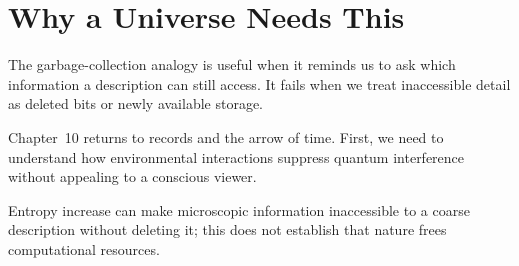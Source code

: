 \section{Why a Universe Needs This}

The garbage-collection analogy is useful when it reminds us to ask which information a description can still access. It fails when we treat inaccessible detail as deleted bits or newly available storage.

Chapter~10 returns to records and the arrow of time. First, we need to understand how environmental interactions suppress quantum interference without appealing to a conscious viewer.

\begin{keytakeawaybox}
Entropy increase can make microscopic information inaccessible to a coarse description without deleting it; this does not establish that nature frees computational resources.
\end{keytakeawaybox}
